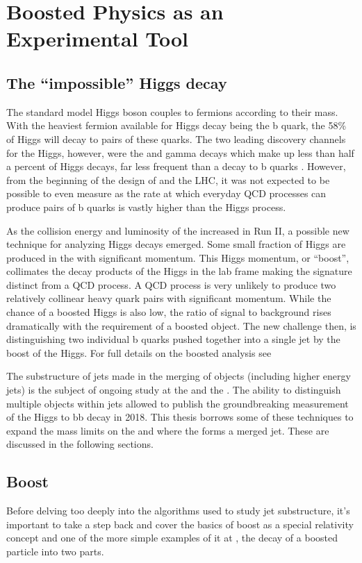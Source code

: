 \chapter{Boosted Physics as an Experimental Tool}
\label{ch:boost}

\section{The ``impossible'' Higgs decay}
The standard model Higgs boson couples to fermions according to their mass. With the heaviest fermion available for Higgs decay being the b quark, the 58\% of Higgs will decay to pairs of these quarks. The two leading discovery channels for the Higgs, however, were the \higgstoZZtollll and \higgstogammagamma gamma decays which make up less than half a percent of Higgs decays, far less frequent than a decay to b quarks \cite{pdg2018}. However, from the beginning of the design of \CMS and the LHC, it was not expected to be possible to even measure \higgstobb as the rate at which everyday QCD processes can produce pairs of b quarks is vastly higher than the Higgs process.

As the collision energy and luminosity of the \LHC increased in Run II, a possible new technique for analyzing Higgs decays emerged. Some small fraction of Higgs are produced in the \LHC with significant momentum. This Higgs momentum, or ``boost'', collimates the decay products of the Higgs in the lab frame making the signature distinct from a QCD process. A QCD process is very unlikely to produce two relatively collinear heavy quark pairs with significant momentum. While the chance of a boosted Higgs is also low, the ratio of signal to background rises dramatically with the requirement of a boosted object. The new challenge then, is distinguishing two individual b quarks pushed together into a single jet by the boost of the Higgs. For full details on the boosted \higgstobb analysis see \cite{boostedHiggsTobb}

The substructure of jets made in the merging of objects (including higher energy jets) is the subject of ongoing study at the \CMS and the \LHC. The ability to distinguish multiple objects within jets allowed \CMS to publish the groundbreaking measurement of the Higgs to bb decay in 2018. This thesis borrows some of these techniques to expand the mass limits on the \WR and \NR where the \NR forms a merged jet. These are discussed in the following sections.

\section{Boost}
Before delving too deeply into the algorithms used to study jet substructure, it's important to take a step back and cover the basics of boost as a special relativity concept and one of the more simple examples of it at \CMS, the decay of a boosted particle into two parts.
